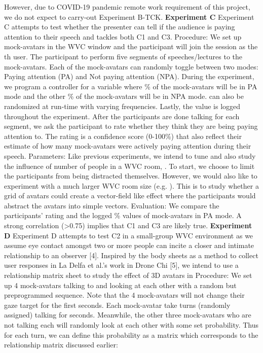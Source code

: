 \documentclass[sigconf,authordraft]{acmart}
\begin{document}
However, due to COVID-19 pandemic remote work requirement of this project, we do not expect to carry-out Experiment B-TCK. 
\newline
\textbf{Experiment C}
\newline
Experiment C attempts to test whether the presenter can tell if the audience is paying attention to their speech and tackles both C1 and C3.
Procedure: We set up  mock-avatars in the WVC window and the participant will join the session as the th user. The participant to perform five segments of speeches/lectures to the mock-avatars. 
Each of the mock-avatars can randomly toggle between two modes: Paying attention (PA) and Not paying attention (NPA). During the experiment, we program a controller for a variable  where \% of the mock-avatars will be in PA mode and the other \% of the mock-avatars will be in NPA mode.  can also be randomized at run-time with varying frequencies. Lastly, the  value is logged throughout the experiment. 
After the participants are done talking for each segment, we ask the participant to rate whether they think they are being paying attention to. The rating is a confidence score (0-100\%) that also reflect their estimate of how many mock-avatars were actively paying attention during their speech.
Parameters: Like previous experiments, we intend to tune and also study the influence of number of people in a WVC room, . To start, we choose  to limit the participants from being distracted themselves. However, we would also like to experiment with a much larger WVC room size (e.g. ). This is to study whether a grid of avatars could create a vector-field like effect where the participants would abstract the avatars into simple vectors.
Evaluation: We compare the participants’ rating and the logged \% values of mock-avatars in PA mode. A strong correlation (>0.75) implies that C1 and C3 are likely true.
\newline
\textbf{Experiment D}
\newline
Experiment D attempts to test C2 in a small-group WVC environment as we assume eye contact amongst two or more people can incite a closer and intimate relationship to an observer [4]. Inspired by the body sheets as a method to collect user responses in La Delfa et al.’s work in Drone Chi [5], we intend to use a relationship matrix sheet to study the effect of 3D avatars in
Procedure: We set up 4 mock-avatars talking to and looking at each other with a random but preprogrammed sequence. Note that the 4 mock-avatars will not change their gaze target for the first  seconds. 
Each mock-avatar take turns (randomly assigned) talking for  seconds. Meanwhile, the other three mock-avatars who are not talking each will randomly look at each other with some set probability. Thus for each turn, we can define this probability as a matrix  which corresponds to the relationship matrix discussed earlier: 
\end{document}
